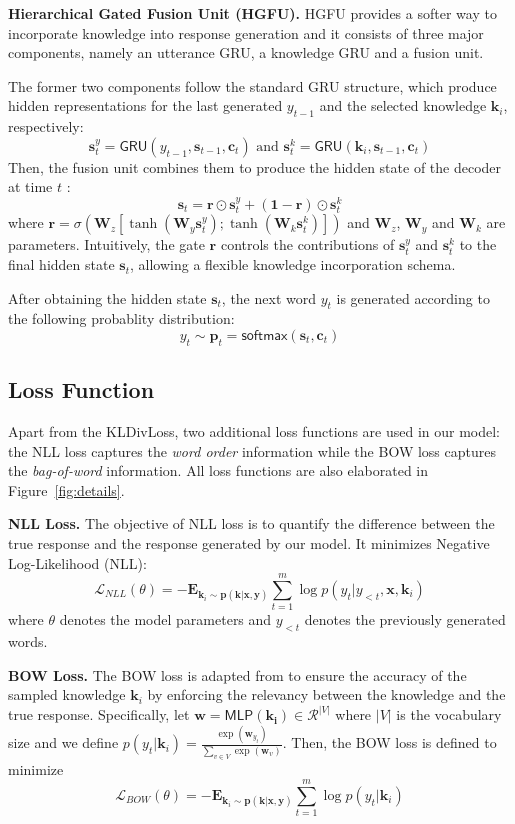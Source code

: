 \documentclass{article}
\begin{document}
\smallskip
\noindent
\textbf{Hierarchical Gated Fusion Unit (HGFU).}
HGFU provides a softer way to incorporate knowledge into response generation and
it consists of three major components,
namely an utterance GRU, a knowledge GRU and a fusion unit.

The former two components follow the standard GRU structure, which
produce hidden representations for the last generated $y_{t-1}$ and the selected knowledge $\mathbf{k}_i$, respectively:
$$
    \mathbf{s}_t^y = \mathsf{GRU}(y_{t-1}, \mathbf{s}_{t-1}, \mathbf{c}_t)
\textrm{ and }
    \mathbf{s}_t^k = \mathsf{GRU}(\mathbf{k}_i, \mathbf{s}_{t-1}, \mathbf{c}_t)
$$
Then,
the fusion unit combines them to produce the hidden state of the decoder at time $t$ \cite{yao2017towards}:
$$ \mathbf{s}_t =  \mathbf{r} \odot \mathbf{s}_t^y + (\mathbf{1}- \mathbf{r}) \odot  \mathbf{s}_t^k$$
where
$\mathbf{r} = \sigma( \mathbf{W}_z[ \tanh(\mathbf{W}_y\mathbf{s}_t^y); \tanh(\mathbf{W}_k\mathbf{s}_t^k)])$ and $\mathbf{W}_z$, $\mathbf{W}_y$ and $\mathbf{W}_k$ are parameters.
Intuitively,
the gate $\mathbf{r}$ controls the contributions of $\mathbf{s}_t^y$ and $\mathbf{s}_t^k$ to the final hidden state $\mathbf{s}_t$,
allowing a flexible knowledge incorporation schema. 

\smallskip
After obtaining the hidden state $\mathbf{s}_t$,
the next word $y_t$ is generated according to the following probablity distribution:
$$y_t \sim \mathbf{p}_t = \mathsf{softmax}(\mathbf{s}_t, \mathbf{c}_t)$$

\subsection{Loss Function}
\label{subsec:loss}
Apart from the KLDivLoss,
two additional loss functions are used in our model:
the NLL loss captures the \emph{word order} information 
while the BOW loss captures the \emph{bag-of-word} information.
All loss functions are also elaborated in Figure~\ref{fig:details}.

\smallskip
\noindent
\textbf{NLL Loss.}
The objective of NLL loss is to quantify the difference between the true response and the response generated by our model.
It minimizes Negative Log-Likelihood (NLL):
$$\mathcal{L}_{NLL}(\theta) = -\mathbf{E}_{\mathbf{k}_i \sim \mathbf{p}(\mathbf{k} |\mathbf{x},\mathbf{y})}\sum_{t=1}^m  \log p(y_t| y_{<t}, \mathbf{x}, \mathbf{k}_i)$$
where $\theta$ denotes the model parameters and
$y_{<t}$ denotes the previously generated words.

\smallskip
\noindent
\textbf{BOW Loss.}
The BOW loss is adapted from  \cite{zhao2017learning} to ensure the accuracy of the sampled knowledge $\mathbf{k}_i$ 
by enforcing the relevancy between the knowledge and the true response.
Specifically, let $\mathbf{w} = \mathsf{MLP}(\mathbf{k_i})  \in \mathcal{R}^{|V|}$ where $|V|$ is the vocabulary size
and we define
$p(y_t | \mathbf{k}_i) = \frac{\exp(\mathbf{w}_{y_t})}{\sum_{v \in V}\exp(\mathbf{w}_{v})}$.
Then, the BOW loss is defined to minimize
$$\mathcal{L}_{BOW}(\theta) = -\mathbf{E}_{\mathbf{k}_i \sim \mathbf{p}(\mathbf{k} |\mathbf{x},\mathbf{y})}\sum_{t= 1}^m \log p(y_t | \mathbf{k}_i) $$
\end{document}
